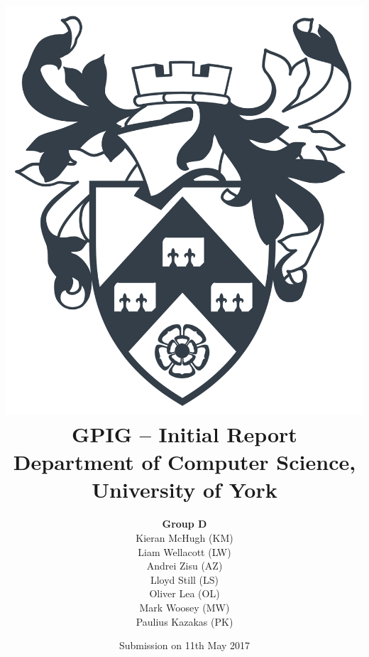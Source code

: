 \documentclass[twoside,a4paper,12pt]{article}
\begin{document}
	\title{ 
	\vspace{1cm}
	{\includegraphics[scale=0.25]{images/shield}} \\
	\vspace{1.5cm}
	{GPIG -- Initial Report}\\
	{\large Department of Computer Science, University of York}\\
	\vspace{1cm}
    }
    \author{\textbf{Group D} \\ Kieran McHugh (KM) \\ Liam Wellacott (LW) \\ Andrei Zisu (AZ) \\ Lloyd Still (LS) \\ Oliver Lea (OL) \\ Mark Woosey (MW) \\ Paulius Kazakas (PK) }
    \date{Submission on 11th May 2017}
    \maketitle 

    \thispagestyle{empty}
    
\end{document}

